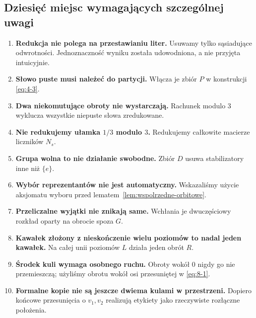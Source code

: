 \documentclass[11pt,a4paper]{article}
\numberwithin{equation}{section}
\theoremstyle{plain}
\theoremstyle{definition}
\theoremstyle{remark}
\begin{document}
\subsection{Dziesięć miejsc wymagających szczególnej uwagi}
\begin{enumerate}
\item \textbf{Redukcja nie polega na przestawianiu liter.} Usuwamy tylko sąsiadujące odwrotności. Jednoznaczność wyniku została udowodniona, a nie przyjęta intuicyjnie.
\item \textbf{Słowo puste musi należeć do partycji.} Włącza je zbiór $P$ w konstrukcji \eqref{eq:4-3}.
\item \textbf{Dwa niekomutujące obroty nie wystarczają.} Rachunek modulo $3$ wyklucza wszystkie niepuste słowa zredukowane.
\item \textbf{Nie redukujemy ułamka $1/3$ modulo $3$.} Redukujemy całkowite macierze liczników $N_s$.
\item \textbf{Grupa wolna to nie działanie swobodne.} Zbiór $D$ usuwa stabilizatory inne niż $\{e\}$.
\item \textbf{Wybór reprezentantów nie jest automatyczny.} Wskazaliśmy użycie aksjomatu wyboru przed lematem~\ref{lem:wspolrzedne-orbitowe}.
\item \textbf{Przeliczalne wyjątki nie znikają same.} Wchłania je dwuczęściowy rozkład oparty na obrocie spoza $G$.
\item \textbf{Kawałek złożony z nieskończenie wielu poziomów to nadal jeden kawałek.} Na całej unii poziomów $L$ działa jeden obrót $R$.
\item \textbf{Środek kuli wymaga osobnego ruchu.} Obroty wokół $0$ nigdy go nie przemieszczą; użyliśmy obrotu wokół osi przesuniętej w \eqref{eq:8-1}.
\item \textbf{Formalne kopie nie są jeszcze dwiema kulami w przestrzeni.} Dopiero końcowe przesunięcia o $v_1,v_2$ realizują etykiety jako rzeczywiste rozłączne położenia.
\end{enumerate}
\end{document}
